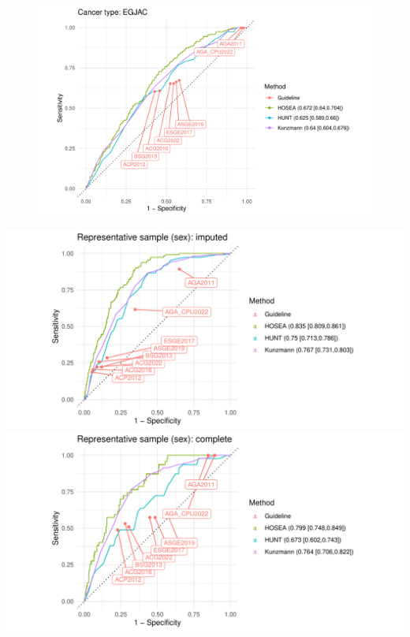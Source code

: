 \documentclass[12pt]{article}
\begin{document}
\begin{figure}[h]
\centering
\includegraphics[width=1.0\textwidth]{figures/comparison_EGJAC.pdf}
\end{figure}

\clearpage

\begin{center}
\includegraphics[width=1.0\textwidth]{figures/comparison_sex_imputed.pdf}
\includegraphics[width=1.0\textwidth]{figures/comparison_sex_complete.pdf}
\end{center}
\end{document}
